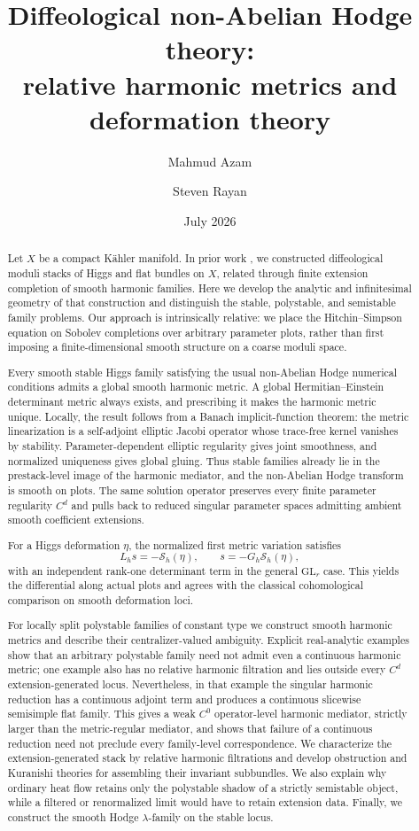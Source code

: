 \documentclass[11pt,reqno]{amsart}
\title[Diffeological non-Abelian Hodge theory: metrics and deformations]{Diffeological non-Abelian Hodge theory:\\relative harmonic metrics and deformation theory}
\author{Mahmud Azam}
\author{Steven Rayan}
\date{July 2026}
\theoremstyle{definition}
\theoremstyle{remark}
\begin{document}
\begin{abstract}
Let $X$ be a compact K\"ahler manifold.  In prior work \cite{AzamRayan2026}, we constructed diffeological moduli stacks of Higgs and flat bundles on $X$, related through finite extension completion of smooth harmonic families.  Here we develop the analytic and infinitesimal geometry of that construction and distinguish the stable, polystable, and semistable family problems.  Our approach is intrinsically relative: we place the Hitchin--Simpson equation on Sobolev completions over arbitrary parameter plots, rather than first imposing a finite-dimensional smooth structure on a coarse moduli space.

Every smooth stable Higgs family satisfying the usual non-Abelian Hodge numerical conditions admits a global smooth harmonic metric.  A global Hermitian--Einstein determinant metric always exists, and prescribing it makes the harmonic metric unique.  Locally, the result follows from a Banach implicit-function theorem: the metric linearization is a self-adjoint elliptic Jacobi operator whose trace-free kernel vanishes by stability.  Parameter-dependent elliptic regularity gives joint smoothness, and normalized uniqueness gives global gluing.  Thus stable families already lie in the prestack-level image of the harmonic mediator, and the non-Abelian Hodge transform is smooth on plots.  The same solution operator preserves every finite parameter regularity $C^d$ and pulls back to reduced singular parameter spaces admitting ambient smooth coefficient extensions.

For a Higgs deformation $\eta$, the normalized first metric variation satisfies
\[
  L_hs=-\mathcal S_h(\eta),
  \qquad
  s=-G_h\mathcal S_h(\eta),
\]
with an independent rank-one determinant term in the general $\mathrm{GL}_r$ case.  This yields the differential along actual plots and agrees with the classical cohomological comparison on smooth deformation loci.

For locally split polystable families of constant type we construct smooth harmonic metrics and describe their centralizer-valued ambiguity.  Explicit real-analytic examples show that an arbitrary polystable family need not admit even a continuous harmonic metric; one example also has no relative harmonic filtration and lies outside every $C^d$ extension-generated locus.  Nevertheless, in that example the singular harmonic reduction has a continuous adjoint term and produces a continuous slicewise semisimple flat family.  This gives a weak $C^0$ operator-level harmonic mediator, strictly larger than the metric-regular mediator, and shows that failure of a continuous reduction need not preclude every family-level correspondence.  We characterize the extension-generated stack by relative harmonic filtrations and develop obstruction and Kuranishi theories for assembling their invariant subbundles.  We also explain why ordinary heat flow retains only the polystable shadow of a strictly semistable object, while a filtered or renormalized limit would have to retain extension data.  Finally, we construct the smooth Hodge $\lambda$-family on the stable locus.
\end{abstract}
\end{document}
